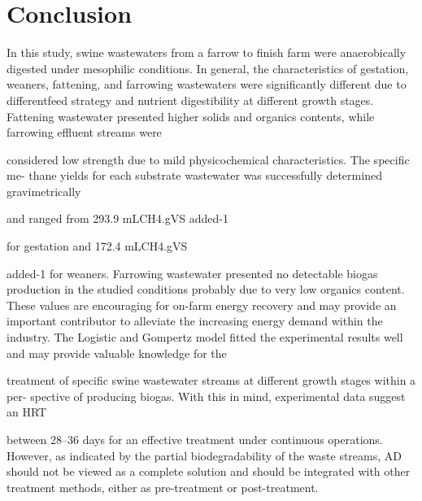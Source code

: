 \section{Conclusion}
In this study, swine wastewaters from a farrow to finish farm were anaerobically digested under mesophilic conditions. In general, the characteristics of gestation, weaners, fattening, and farrowing wastewaters were significantly different due to differentfeed strategy and nutrient digestibility at different growth stages. Fattening wastewater
presented higher solids and organics contents, while farrowing effluent streams were

considered low strength due to mild physicochemical characteristics. The specific me-
thane yields for each substrate wastewater was successfully determined gravimetrically

and ranged from 293.9 mLCH4.gVS added-1

for gestation and 172.4 mLCH4.gVS

added-1
for weaners. Farrowing wastewater presented no detectable biogas production
in the studied conditions probably due to very low organics content. These values are
encouraging for on-farm energy recovery and may provide an important contributor to
alleviate the increasing energy demand within the industry. The Logistic and Gompertz
model fitted the experimental results well and may provide valuable knowledge for the

treatment of specific swine wastewater streams at different growth stages within a per-
spective of producing biogas. With this in mind, experimental data suggest an HRT

between 28–36 days for an effective treatment under continuous operations. However,
as indicated by the partial biodegradability of the waste streams, AD should not be
viewed as a complete solution and should be integrated with other treatment methods,
either as pre-treatment or post-treatment.